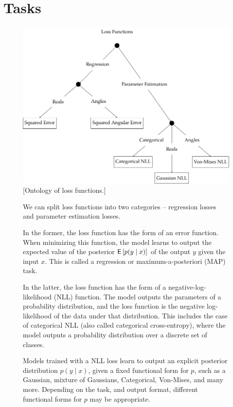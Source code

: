 \section{Tasks}
\label{s:tasks}

\begin{figure}
    \centering
        \includegraphics[width=.7\linewidth]{figures/ontology-1-loss.pdf}
        \vspace{1cm}
        \captionsetup{parskip=7pt}
        [Ontology of loss functions.]{We can split loss functions into two categories -- regression losses and parameter estimation losses.

        In the former, the loss function has the form of an error function. When minimizing this function, the model learns to output the expected value of the posterior $\mathsf{E}\left[p(y \mid x)\right]$ of the output $y$ given the input $x$. This is called a regression or maximum-a-posteriori (MAP) task.

        In the latter, the loss function has the form of a negative-log-likelihood (NLL) function. The model outputs the parameters of a probability distribution, and the loss function is the negative log-likelihood of the data under that distribution. This includes the case of categorical NLL (also called categorical cross-entropy), where the model outputs a probability distribution over a discrete set of classes.

        Models trained with a NLL loss learn to output an explicit posterior distribution $p(y \mid x)$, given a fixed functional form for $p$, such as a Gaussian, mixture of Gaussians, Categorical, Von-Mises, and many more. Depending on the task, and output format, different functional forms for $p$ may be appropriate.}
        \label{fig:ontology-loss}
\end{figure}

